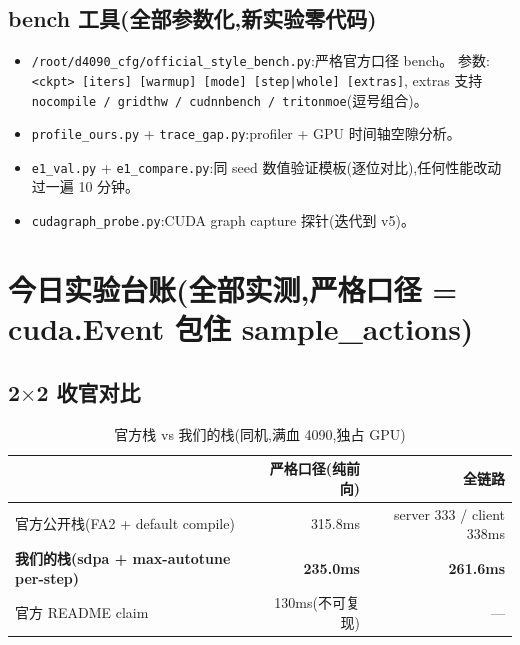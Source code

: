 \documentclass[11pt]{ctexart}
\begin{document}
\subsection{bench 工具(全部参数化,新实验零代码)}
\begin{itemize}
\item \texttt{/root/d4090\_cfg/official\_style\_bench.py}:严格官方口径 bench。
参数:\texttt{<ckpt> [iters] [warmup] [mode] [step|whole] [extras]},
extras 支持 \texttt{nocompile / gridthw / cudnnbench / tritonmoe}(逗号组合)。
\item \texttt{profile\_ours.py} + \texttt{trace\_gap.py}:profiler + GPU 时间轴空隙分析。
\item \texttt{e1\_val.py} + \texttt{e1\_compare.py}:同 seed 数值验证模板(逐位对比),任何性能改动过一遍 10 分钟。
\item \texttt{cudagraph\_probe.py}:CUDA graph capture 探针(迭代到 v5)。
\end{itemize}

\section{今日实验台账(全部实测,严格口径 = cuda.Event 包住 sample\_actions)}

\subsection{2$\times$2 收官对比}
\begin{table}[htbp]
\centering\small
\caption{官方栈 vs 我们的栈(同机,满血 4090,独占 GPU)}
\begin{tabular}{@{}lrr@{}}
\toprule
 & 严格口径(纯前向) & 全链路 \\
\midrule
官方公开栈(FA2 + default compile) & 315.8ms & server 333 / client 338ms \\
\textbf{我们的栈(sdpa + max-autotune per-step)} & \textbf{235.0ms} & \textbf{261.6ms} \\
官方 README claim & 130ms(不可复现) & --- \\
\bottomrule
\end{tabular}
\end{table}
\end{document}
